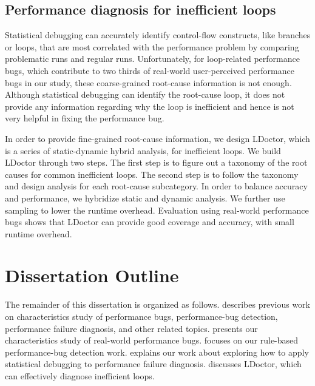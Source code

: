 \subsection{Performance diagnosis for inefficient loops}
Statistical debugging can accurately identify control-flow constructs, like branches or loops,
that are most correlated with the performance problem by comparing problematic runs and regular runs. 
Unfortunately, for loop-related performance bugs, which contribute to
two thirds of real-world user-perceived performance bugs in our study, 
these coarse-grained root-cause information is not enough.
Although statistical debugging can identify the root-cause loop, it does
not provide any information regarding why the loop is inefficient 
and hence is not very helpful in fixing the performance bug.


In order to provide fine-grained root-cause information, we design LDoctor, 
which is a series of static-dynamic hybrid analysis, for inefficient loops. 
We build LDoctor through two steps. 
The first step is to figure out a taxonomy of the root causes for common inefficient loops. 
The second step is to follow the taxonomy and design analysis for each root-cause subcategory. 
In order to balance accuracy and performance, we hybridize static and dynamic analysis. 
We further use sampling to lower the runtime overhead. 
Evaluation using real-world performance bugs shows that LDoctor can provide good coverage and accuracy, 
with small runtime overhead.

\section{Dissertation Outline}
The remainder of this dissertation is organized as follows. 
 describes previous work on characteristics study of performance bugs, 
performance-bug detection, performance failure diagnosis, and other related topics. 
 presents our characteristics study of real-world performance bugs. 
 focuses on our rule-based performance-bug detection work. 
 explains our work about exploring how to apply statistical debugging to performance failure diagnosis. 
 discusses LDoctor, which can effectively diagnose inefficient loops. 
